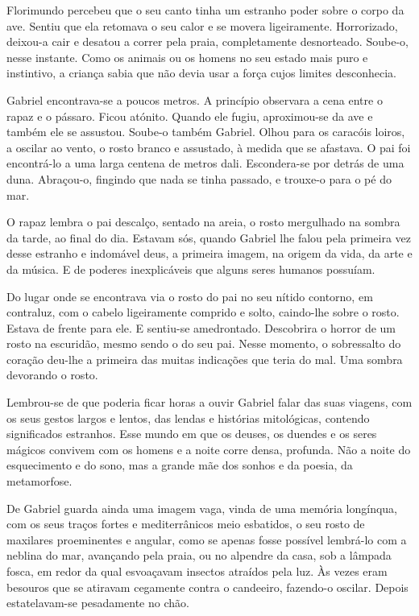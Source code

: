 Florimundo percebeu que o seu canto tinha um estranho poder sobre o
corpo da ave. Sentiu que ela retomava o seu calor e se movera
ligeiramente. Horrorizado, deixou-a cair e desatou a correr pela praia,
completamente desnorteado. Soube-o, nesse instante. Como os animais ou
os homens no seu estado mais puro e instintivo, a criança sabia que não
devia usar a força cujos limites desconhecia.

Gabriel encontrava-se a poucos metros. A princípio observara a cena
entre o rapaz e o pássaro. Ficou atónito. Quando ele fugiu, aproximou-se
da ave e também ele se assustou. Soube-o também Gabriel. Olhou para os
caracóis loiros, a oscilar ao vento, o rosto branco e assustado, à
medida que se afastava. O pai foi encontrá-lo a uma larga centena de
metros dali. Escondera-se por detrás de uma duna. Abraçou-o, fingindo
que nada se tinha passado, e trouxe-o para o pé do mar.

O rapaz lembra o pai descalço, sentado na areia, o rosto mergulhado na
sombra da tarde, ao final do dia. Estavam sós, quando Gabriel lhe falou
pela primeira vez desse estranho e indomável deus, a primeira imagem, na
origem da vida, da arte e da música. E de poderes inexplicáveis que
alguns seres humanos possuíam.

Do lugar onde se encontrava via o rosto do pai no seu nítido contorno,
em contraluz, com o cabelo ligeiramente comprido e solto, caindo-lhe
sobre o rosto. Estava de frente para ele. E sentiu-se amedrontado.
Descobrira o horror de um rosto na escuridão, mesmo sendo o do seu pai.
Nesse momento, o sobressalto do coração deu-lhe a primeira das muitas
indicações que teria do mal. Uma sombra devorando o rosto.

Lembrou-se de que poderia ficar horas a ouvir Gabriel falar das suas
viagens, com os seus gestos largos e lentos, das lendas e histórias
mitológicas, contendo significados estranhos. Esse mundo em que os
deuses, os duendes e os seres mágicos convivem com os homens e a noite
corre densa, profunda. Não a noite do esquecimento e do sono, mas a
grande mãe dos sonhos e da poesia, da metamorfose.

De Gabriel guarda ainda uma imagem vaga, vinda de uma memória longínqua,
com os seus traços fortes e mediterrânicos meio esbatidos, o seu rosto
de maxilares proeminentes e angular, como se apenas fosse possível
lembrá-lo com a neblina do mar, avançando pela praia, ou no alpendre da
casa, sob a lâmpada fosca, em redor da qual esvoaçavam insectos atraídos
pela luz. Às vezes eram besouros que se atiravam cegamente contra o
candeeiro, fazendo-o oscilar. Depois estatelavam-se pesadamente no chão.

